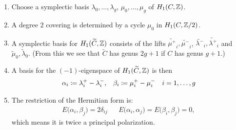 \begin{frame}
    

\begin{enumerate}[<+->]
	\item Choose a symplectic basis $\lambda_0, \ldots, \lambda_g$, $\mu_0, \ldots, \mu_g$ of $H_1(C,\mathbb{Z})$.

	\item A degree $2$ covering is determined by a cycle $\mu_0$ in $H_1(C, \mathbb{Z}/2)$.

	\item A symplectic basis for $H_1(\widetilde C, \mathbb{Z})$ consists of the lifts $\widetilde{\mu^+}_i, \widetilde{\mu^-}_i$, $\widetilde{\lambda^-}_i, \widetilde{\lambda^+}_i$ and $\widetilde{\mu}_0, \widetilde{\lambda}_0$. (From this we see that $\widetilde C$ has genus $2g+1$ if $C$ has genus $g+1$.)

	\item A basis for the $(-1)$-eigenspace of $H_1(\widetilde C,\mathbb{Z})$ is then
	\begin{align*}
	\alpha_i \coloneqq \lambda_i^+ - \lambda_i^-, && \beta_i \coloneqq \mu_i^+ - \mu_i^- && i=1,\ldots, g
	\end{align*}

	\item The restriction of the Hermitian form is:
	\begin{align*}
	E\big(\alpha_i,\beta_j\big)= 2 \delta_{ij} && E\big(\alpha_i, \alpha_j\big) = E\big(\beta_i,\beta_j\big)=0,
	\end{align*}
	which means it is twice a principal polarization.
\end{enumerate}


\end{frame}